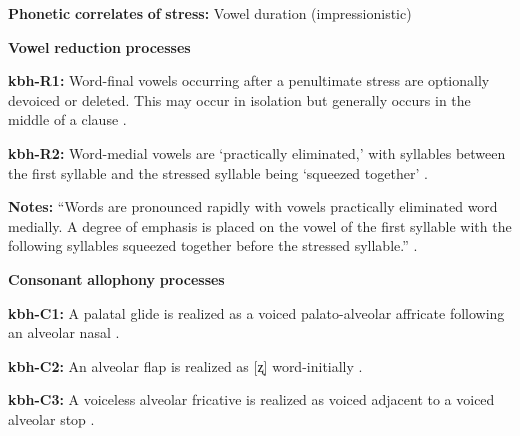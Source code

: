 \begin{styleBody}
\textbf{Phonetic} \textbf{correlates} \textbf{of} \textbf{stress:} Vowel duration (impressionistic)
\end{styleBody}

\begin{styleBody}
\textbf{Vowel} \textbf{reduction} \textbf{processes}
\end{styleBody}

\begin{styleBody}
\textbf{kbh-R1:} Word-final vowels occurring after a penultimate stress are optionally devoiced or deleted. This may occur in isolation but generally occurs in the middle of a clause \citep[86]{Howard1967}.
\end{styleBody}

\begin{styleBody}
\textbf{kbh-R2:} Word-medial vowels are ‘practically eliminated,’ with syllables between the first syllable and the stressed syllable being ‘squeezed together’ \citep[86-7]{Howard1967}.
\end{styleBody}

\begin{styleBody}
\textbf{Notes:} “Words are pronounced rapidly with vowels practically eliminated word medially. A degree of emphasis is placed on the vowel of the first syllable with the following syllables squeezed together before the stressed syllable.” \citep[86-7]{Howard1967}.
\end{styleBody}

\begin{styleBody}
\textbf{Consonant} \textbf{allophony} \textbf{processes}
\end{styleBody}

\begin{styleBody}
\textbf{kbh-C1:} A palatal glide is realized as a voiced palato-alveolar affricate following an alveolar nasal \citep{Howard1967}.
\end{styleBody}

\begin{styleBody}
\textbf{kbh-C2:} An alveolar flap is realized as [ʐ] word-initially \citep[78]{Howard1967}.
\end{styleBody}

\begin{styleBody}
\textbf{kbh-C3:} A voiceless alveolar fricative is realized as voiced adjacent to a voiced alveolar stop \citep[78]{Howard1967}.
\end{styleBody}

